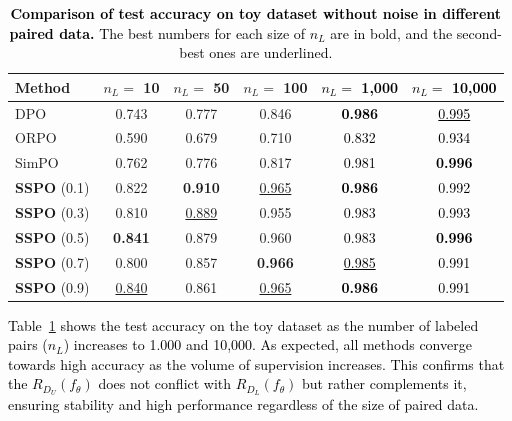 \documentclass{article} %
\newcommand\rebuttal[1]{\textcolor{black}{#1}}
\begin{document}
\begin{table} 

    \centering
    \small 
    \setlength{\tabcolsep}{1.1mm} 
    \caption{\rebuttal{\textbf{Comparison of test accuracy on toy dataset without noise in different paired data.} The best numbers for each size of $n_L$ are in bold, and the second-best ones are underlined.}}
    \vspace{-1mm}
    \label{tab:toy_much_paired_data}
    \begin{tabular}{l ccccc}
        \toprule
        \textbf{Method} & $n_L=$ 10 & $n_L=$ 50 & $n_L=$ 100 & \rebuttal{$n_L=$ 1,000} & \rebuttal{$n_L=$ 10,000} \\
        \midrule
        DPO                      & 0.743 & 0.777 & 0.846 & \textbf{\rebuttal{0.986}} & \rebuttal{\underline{0.995}} \\
        ORPO                     & 0.590 & 0.679 & 0.710 & \rebuttal{0.832} & \rebuttal{0.934} \\
        SimPO                    & 0.762 & 0.776 & 0.817 & \rebuttal{0.981} & \textbf{\rebuttal{0.996}} \\
        \textbf{SSPO} (0.1)      & 0.822 & \textbf{0.910} & \underline{0.965} & \textbf{\rebuttal{0.986}} & \rebuttal{0.992} \\
        \textbf{SSPO} (0.3)      & 0.810 & \underline{0.889} & 0.955 & \rebuttal{0.983} & \rebuttal{0.993} \\
        \textbf{SSPO} (0.5)      & \textbf{0.841} & 0.879 & 0.960 & \rebuttal{0.983} & \textbf{\rebuttal{0.996}} \\
        \textbf{SSPO} (0.7)      & 0.800 & 0.857 & \textbf{0.966} & \rebuttal{\underline{0.985}} & \rebuttal{0.991} \\
        \textbf{SSPO} (0.9)      & \underline{0.840} & 0.861 & \underline{0.965} & \textbf{\rebuttal{0.986}} & \rebuttal{0.991} \\
        \bottomrule
    \end{tabular}

\end{table}


\rebuttal{Table~\ref{tab:toy_much_paired_data} shows the test accuracy on the toy dataset as the number of labeled pairs ($n_L$) increases to 1.000 and 10,000. As expected, all methods converge towards high accuracy as the volume of supervision increases. This confirms that the $R_{D_U}(f_\theta)$ does not conflict with $R_{D_L}(f_\theta)$ but rather complements it, ensuring stability and high performance regardless of the size of paired data.}
\end{document}
